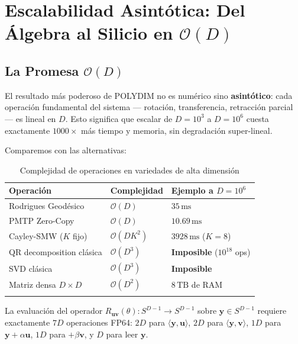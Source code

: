 \chapter{Escalabilidad Asintótica: Del Álgebra al Silicio en $\mathcal{O}(D)$}
\label{ch:escalabilidad}

\section{La Promesa $\mathcal{O}(D)$}

El resultado más poderoso de POLYDIM no es numérico sino \textbf{asintótico}: cada
operación fundamental del sistema --- rotación, transferencia, retracción parcial ---
es lineal en $D$. Esto significa que escalar de $D = 10^3$ a $D = 10^6$ cuesta
exactamente $1000\times$ más tiempo y memoria, sin degradación super-lineal.

Comparemos con las alternativas:

\begin{longtable}{lll}
\toprule
\textbf{Operación} & \textbf{Complejidad} & \textbf{Ejemplo a $D=10^6$} \\
\midrule
Rodrigues Geodésico & $\mathcal{O}(D)$ & $35\,\text{ms}$ \\
PMTP Zero-Copy & $\mathcal{O}(D)$ & $10.69\,\text{ms}$ \\
Cayley-SMW ($K$ fijo) & $\mathcal{O}(DK^2)$ & $3928\,\text{ms}$ ($K=8$) \\
QR decomposition clásica & $\mathcal{O}(D^3)$ & \textbf{Imposible} ($10^{18}$ ops) \\
SVD clásica & $\mathcal{O}(D^3)$ & \textbf{Imposible} \\
Matriz densa $D\times D$ & $\mathcal{O}(D^2)$ & $8\,\text{TB}$ de RAM \\
\bottomrule
\caption{Complejidad de operaciones en variedades de alta dimensión}
\label{tab:complejidad}
\end{longtable}

\begin{theorem}
La evaluación del operador $R_{\mathbf{u}\mathbf{v}}(\theta) : S^{D-1} \to S^{D-1}$
sobre $\mathbf{y} \in S^{D-1}$ requiere exactamente $7D$ operaciones FP64:
$2D$ para $\langle\mathbf{y},\mathbf{u}\rangle$, $2D$ para $\langle\mathbf{y},\mathbf{v}\rangle$,
$1D$ para $\mathbf{y} + \alpha\mathbf{u}$, $1D$ para $+\beta\mathbf{v}$, y $D$ para leer $\mathbf{y}$.
\end{theorem}


